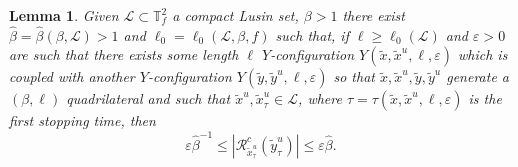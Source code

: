 \documentclass[a4paper,11pt,reqno]{amsart}
\newcommand{\TTf}{{\mathbb{T}_f^2}}
\newcommand{\cL}{{\mathcal L}}
\newcommand{\cR}{{\mathcal R}}
\newcommand{\eps}{\varepsilon}
\newcommand{\tix}{\tilde{x}}
\newtheorem{lemma}[theorem]{Lemma}
\theoremstyle{definition}
\begin{document}
\begin{lemma}
    \label{lem:driftestimate}
Given $\cL\subset\TTf$ a compact Lusin set, $\beta>1$ there exist $\hat{\beta}=\hat{\beta}(\beta,\cL)>1$ and $\ell_0=\ell_0(\cL,\beta,f)$ such that, if $\ell\geq\ell_0(\cL)$ and $\eps>0$ are such that there exists some length $\ell$ $Y$-configuration 
$Y(\tix,\tix^u,\ell,\eps)$ which is coupled with another $Y$-configuration $Y(\tilde{y},\tilde{y}^u,\ell,\eps)$ so that $\tix,\tix^u,\tilde{y},\tilde{y}^u$ generate a $(\beta,\ell)$ 
quadrilateral and such that $\tix^u,\tix^u_\tau\in\cL$, where $\tau=\tau(\tix,\tix^u,\ell,\eps)$ is the first stopping time, then 
\[
\eps\hat{\beta}^{-1}\leq|\cR^c_{\tix^u_\tau}(\tilde{y}^u_\tau)|\leq\eps\hat{\beta}.
\]
\end{lemma}
\end{document}
